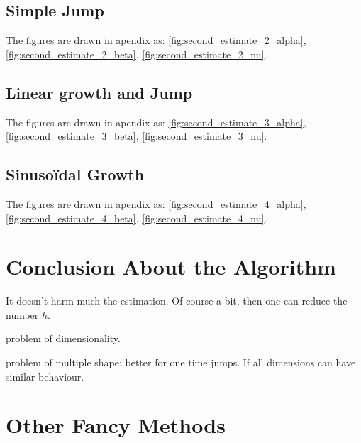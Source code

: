 \documentclass[11pt]{book}
\begin{document}
\subsection{Simple Jump}

The figures are drawn in apendix as: \ref{fig:second_estimate_2_alpha}, \ref{fig:second_estimate_2_beta}, \ref{fig:second_estimate_2_nu}.


\subsection{Linear growth and Jump}


The figures are drawn in apendix as: \ref{fig:second_estimate_3_alpha}, \ref{fig:second_estimate_3_beta}, \ref{fig:second_estimate_3_nu}.


\subsection{Sinusoïdal Growth}


The figures are drawn in apendix as: \ref{fig:second_estimate_4_alpha}, \ref{fig:second_estimate_4_beta}, \ref{fig:second_estimate_4_nu}.


\section{Conclusion About the Algorithm}

It doesn't harm much the estimation. Of course a bit, then one can reduce the number $h$.

problem of dimensionality. 

problem of multiple shape: better for one time jumps. If all dimensions can have similar behaviour.

































\section{Other Fancy Methods}
\end{document}
